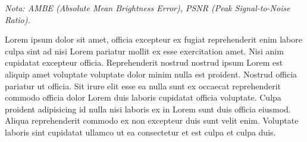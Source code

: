 \documentclass[sigchi]{acmart}
\begin{document}
\begin{table}[H]
	\centering
	\caption{Métricas de calidad para la imagen 2015\_00002.png}
	\label{tab:metricas_2015_00002}

	\vspace{0.5em} %


	\vspace{0.5em} %
	\footnotesize%
	\textit{Nota: AMBE (Absolute Mean Brightness Error), PSNR (Peak Signal-to-Noise Ratio).}
\end{table}

Lorem ipsum dolor sit amet, officia excepteur ex fugiat reprehenderit enim labore culpa sint ad
nisi Lorem pariatur mollit ex esse exercitation amet. Nisi anim cupidatat excepteur officia.
Reprehenderit nostrud nostrud ipsum Lorem est aliquip amet voluptate voluptate dolor minim
nulla est proident. Nostrud officia pariatur ut officia. Sit irure elit esse ea nulla sunt ex
occaecat reprehenderit commodo officia dolor Lorem duis laboris cupidatat officia voluptate.
Culpa proident adipisicing id nulla nisi laboris ex in Lorem sunt duis officia eiusmod. Aliqua
reprehenderit commodo ex non excepteur duis sunt velit enim. Voluptate laboris sint cupidatat
ullamco ut ea consectetur et est culpa et culpa duis.
\end{document}
